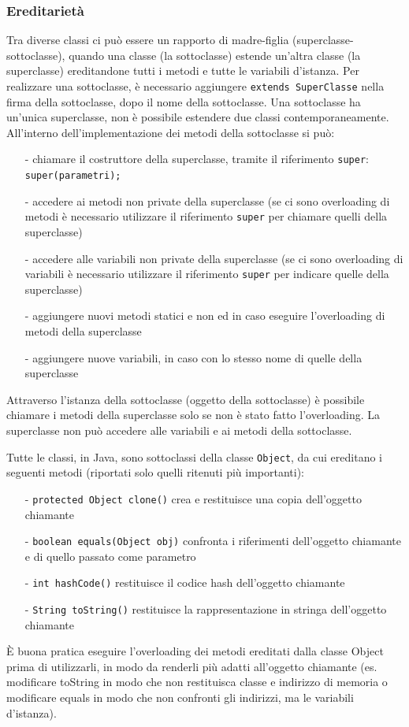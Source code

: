 \documentclass{article}
\begin{document}
\subsubsection*{Ereditarietà}
Tra diverse classi ci può essere un rapporto di madre-figlia (superclasse-sottoclasse), quando una classe (la sottoclasse)
estende un'altra classe (la superclasse) ereditandone tutti i metodi e tutte le variabili d'istanza.
Per realizzare una sottoclasse, è necessario aggiungere \verb|extends SuperClasse| nella firma della sottoclasse, dopo il nome
della sottoclasse. Una sottoclasse ha un'unica superclasse, non è possibile estendere due classi contemporaneamente. \\
All'interno dell'implementazione dei metodi della sottoclasse si può:
\begin{itemize} [topsep=3pt, itemsep=0pt]
	\item[-] chiamare il costruttore della superclasse, tramite il riferimento \verb|super|: \verb|super(parametri);|
	\item[-] accedere ai metodi non private della superclasse (se ci sono overloading di metodi è necessario utilizzare
	il riferimento \verb|super| per chiamare quelli della superclasse)
	\item[-] accedere alle variabili non private della superclasse (se ci sono overloading di variabili è necessario
	utilizzare il riferimento \verb|super| per indicare quelle della superclasse)
	\item[-] aggiungere nuovi metodi statici e non ed in caso eseguire l'overloading di metodi della superclasse
	\item[-] aggiungere nuove variabili, in caso con lo stesso nome di quelle della superclasse
\end{itemize}
Attraverso l'istanza della sottoclasse (oggetto della sottoclasse) è possibile chiamare i metodi della superclasse solo se
non è stato fatto l'overloading. La superclasse non può accedere alle variabili e ai metodi della sottoclasse.

Tutte le classi, in Java, sono sottoclassi della classe \verb|Object|, da cui ereditano i seguenti metodi (riportati solo quelli
ritenuti più importanti):
\begin{itemize} [topsep=3pt, itemsep=0pt]
	\item[-] \verb|protected Object clone()| crea e restituisce una copia dell'oggetto chiamante
	\item[-] \verb|boolean equals(Object obj)| confronta i riferimenti dell'oggetto chiamante e di quello passato come parametro
	\item[-] \verb|int hashCode()| restituisce il codice hash dell'oggetto chiamante
	\item[-] \verb|String toString()| restituisce la rappresentazione in stringa dell'oggetto chiamante
\end{itemize}
È buona pratica eseguire l'overloading dei metodi ereditati dalla classe Object prima di utilizzarli, in modo da renderli
più adatti all'oggetto chiamante (es. modificare toString in modo che non restituisca classe e indirizzo di memoria o modificare
equals in modo che non confronti gli indirizzi, ma le variabili d'istanza).
\end{document}
